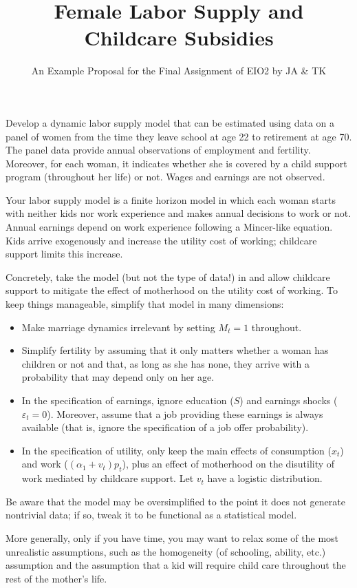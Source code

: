 \documentclass[fleqn,12pt]{article}
\title{Female Labor Supply and Childcare Subsidies}
\author{An Example Proposal for the Final Assignment of EIO2 by JA \& TK}
\date{}
\begin{document}
\maketitle

Develop a dynamic labor supply model that can be estimated using data on a panel of women from the time they leave school at age 22 to retirement at age 70. The panel data provide annual observations of employment and fertility. Moreover, for each woman, it indicates whether she is covered by a child support program (throughout her life) or not. Wages and earnings are not observed. 

Your labor supply model is a finite horizon model in which each woman starts with neither kids nor work experience and makes annual decisions to work or not. Annual earnings depend on work experience following a Mincer-like equation. Kids arrive exogenously and increase the utility cost of working; childcare support limits this increase. 

Concretely, take the model (but not the type of data!) in \citet[][Section 3]{ecma11:ecksteinwolpin} and allow childcare support to mitigate the effect of motherhood on the utility cost of working. To keep things manageable, simplify that model in many dimensions:
\begin{itemize}
\item Make marriage dynamics irrelevant by setting  $M_t=1$ throughout.
\item Simplify fertility by assuming that it only matters whether a woman has children or not and that, as long as she has none, they arrive with a probability that may depend only on her age. 
\item In the specification of earnings, ignore education ($S$) and earnings shocks ($\varepsilon_t=0$). Moreover, assume that a job providing these earnings is always available (that is, ignore the specification of a job offer probability).
\item In the specification of utility, only keep the main effects of consumption ($x_t$) and work ($(\alpha_1+v_t)p_t$), plus an effect of motherhood on the disutility of work mediated by childcare support. Let  $v_t$ have a logistic distribution.
\end{itemize}
Be aware that the model may be oversimplified to the point it does not generate nontrivial data; if so, tweak it to be functional as a statistical model. 

More generally, only if you have time, you may want to relax some of the most unrealistic assumptions, such as the homogeneity (of schooling, ability, etc.) assumption and the assumption that a kid will require child care throughout the rest of the mother's life. 



\end{document}
